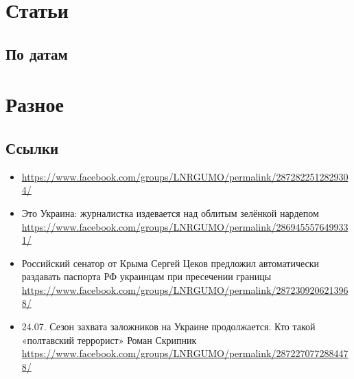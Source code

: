  


\part{Статьи}
\chapter{По датам}


\part{Разное}
\chapter{Ссылки}

\begin{itemize}
		\item 
			\url{https://www.facebook.com/groups/LNRGUMO/permalink/2872822512829304/}

		\item Это Украина: журналистка издевается над облитым зелёнкой нардепом 
			\url{https://www.facebook.com/groups/LNRGUMO/permalink/2869455576499331/}

		\item Российский сенатор от Крыма Сергей Цеков предложил автоматически раздавать паспорта РФ украинцам при пресечении границы
						\url{https://www.facebook.com/groups/LNRGUMO/permalink/2872309206213968/}
		\item 24.07. Сезон захвата заложников на Украине продолжается. Кто такой «полтавский террорист» Роман Скрипник
						\url{https://www.facebook.com/groups/LNRGUMO/permalink/2872270772884478/}
\end{itemize}


